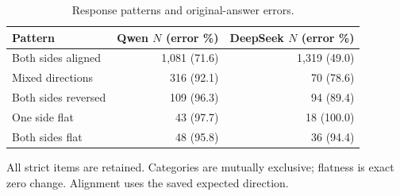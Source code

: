 \begin{table}[t]
\centering\small
\caption{Response patterns and original-answer errors.}
\label{tab:patterns}
\setlength{\tabcolsep}{4pt}
\begin{tabular}{@{}lrr@{}}
\toprule
Pattern & Qwen $N$ (error \%) & DeepSeek $N$ (error \%)\\
\midrule
Both sides aligned & 1,081 (71.6) & 1,319 (49.0)\\
Mixed directions & 316 (92.1) & 70 (78.6)\\
Both sides reversed & 109 (96.3) & 94 (89.4)\\
One side flat & 43 (97.7) & 18 (100.0)\\
Both sides flat & 48 (95.8) & 36 (94.4)\\
\bottomrule
\end{tabular}
\par\vspace{3pt}\begin{minipage}{\textwidth}\footnotesize All strict items are retained. Categories are mutually exclusive; flatness is exact zero change. Alignment uses the saved expected direction.\end{minipage}
\end{table}
